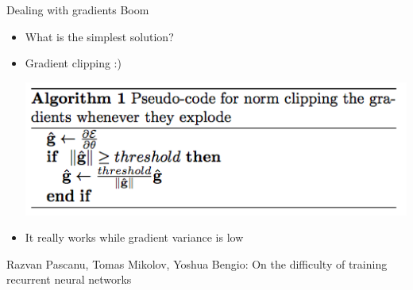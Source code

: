 \documentclass{beamer}
\begin{document}
\begin{frame}{Dealing with gradients Boom}
	\begin{itemize}
		 \item What is the simplest solution?
		 \item Gradient clipping :)
			 \begin{center}
				\includegraphics[scale=0.5]{./img/grad_clip}
			\end{center}
		 \item It really works while gradient variance is low
	\end{itemize}
	
		 \vspace{0.5cm}
		{\tiny Razvan Pascanu, Tomas Mikolov, Yoshua Bengio: On the difficulty of training recurrent neural networks}
\end{frame}
\end{document}
